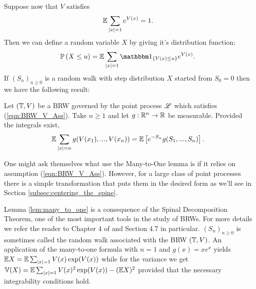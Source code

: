 Suppose now that $V$ satisfies
\begin{equation}\label{eqn:BRW_V_Ass}
\mathbb{E} \sum\limits_{|x|=1} e^{V(x)} = 1. 
\end{equation}
Then we can define a random variable $X$ by giving it's distribution function: 
\begin{equation}\nonumber
\Pr{X \leq u} = \E \sum\limits_{|x| = 1} \Ind_{\{V(x) \leq u\}} e^{V(x)}. 
\end{equation}
If $(S_n)_{n\geq0}$ is a random walk with step distribution $X$ started from $S_0 = 0$ then we have the following result:
\begin{lemma}\label{lem:many_to_one}
Let $(\mathbb{T}, V)$ be a BRW governed by the point process $\mathscr{L}$ which satisfies (\ref{eqn:BRW_V_Ass}). Take $n \geq 1$ and let $g:\mathbb{R}^n \to \mathbb{R}$ be measurable. Provided the integrals exist, 
\begin{equation}\nonumber
\mathbb{E} \sum\limits_{|x| = n} g(V(x_1), ...,V(x_n)) = \mathbb{E}\left[ e^{-S_n} g(S_1, ...,S_n) \right]. 
\end{equation}
\end{lemma}
\begin{remark}
One might ask themselves what use the Many-to-One lemma is if it relies on assumption (\ref{eqn:BRW_V_Ass}). However, for a large class of point processes there is a simple transformation that puts them in the desired form as we'll see in Section \ref{subsec:centering_the_spine}. 
\end{remark}

Lemma \ref{lem:many_to_one} is a consequence of the Spinal Decomposition Theorem, one of the most important tools in the study of BRWs. For more details we refer the reader to Chapter 4 of \cite{shi2015branching} and Section 4.7 in particular. $(S_n)_{n\geq0}$ is sometimes called the random walk associated with the BRW $(\mathbb{T}, V)$. An application of the many-to-one formula with $n=1$ and $g(x) = x e^x$ yields $\mathbb{E} X = \mathbb{E} \sum_{|x|=1} V(x) \exp(V(x))$ while for the variance we get $\mathbb{V}(X) = \mathbb{E} \sum_{|x|=1} V(x)^2 \exp(V(x)) - (\mathbb{E} X)^2$ provided that the necessary integrability conditions hold. \\





